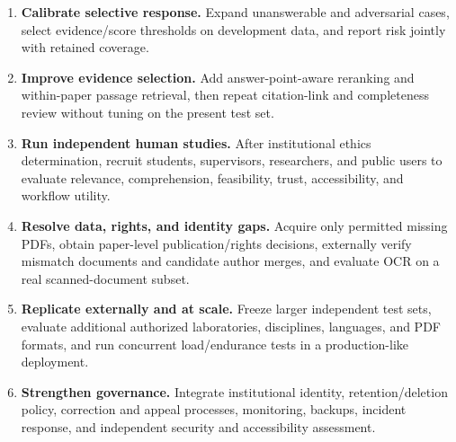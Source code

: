 \begin{enumerate}
  \item \textbf{Calibrate selective response.} Expand unanswerable and adversarial cases, select evidence/score thresholds on development data, and report risk jointly with retained coverage.
  \item \textbf{Improve evidence selection.} Add answer-point-aware reranking and within-paper passage retrieval, then repeat citation-link and completeness review without tuning on the present test set.
  \item \textbf{Run independent human studies.} After institutional ethics determination, recruit students, supervisors, researchers, and public users to evaluate relevance, comprehension, feasibility, trust, accessibility, and workflow utility.
  \item \textbf{Resolve data, rights, and identity gaps.} Acquire only permitted missing PDFs, obtain paper-level publication/rights decisions, externally verify mismatch documents and candidate author merges, and evaluate OCR on a real scanned-document subset.
  \item \textbf{Replicate externally and at scale.} Freeze larger independent test sets, evaluate additional authorized laboratories, disciplines, languages, and PDF formats, and run concurrent load/endurance tests in a production-like deployment.
  \item \textbf{Strengthen governance.} Integrate institutional identity, retention/deletion policy, correction and appeal processes, monitoring, backups, incident response, and independent security and accessibility assessment.
\end{enumerate}
